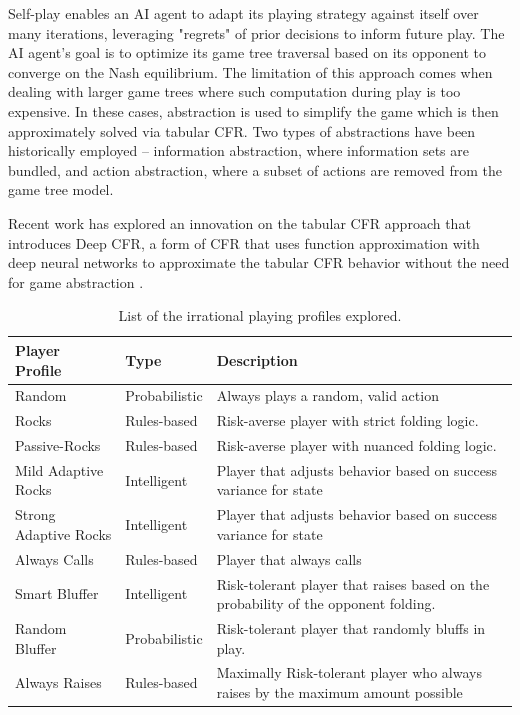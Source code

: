 \documentclass{article}
\begin{document}
\indent Self-play enables an AI agent to adapt its playing strategy against itself over many iterations, leveraging "regrets" of prior decisions to inform future play. The AI agent's goal is to optimize its game tree traversal based on its opponent to converge on the Nash equilibrium. The limitation of this approach comes when dealing with larger game trees where such computation during play is too expensive. In these cases, abstraction is used to simplify the game which is then approximately solved via tabular CFR. Two types of abstractions have been historically employed -- information abstraction, where information sets are bundled, and action abstraction, where a subset of actions are removed from the game tree model.

\indent Recent work has explored an innovation on the tabular CFR approach that introduces Deep CFR, a form of CFR that uses function approximation with deep neural networks to approximate the tabular CFR behavior without the need for game abstraction \cite{brown2018deep}.

\begin{table}[!b]
\small
\centering
{\begin{tabular}{|l|l|l|}
\hline
Player Profile & Type & Description \\
\hline\hline
Random & Probabilistic & Always plays a random, valid action \\
Rocks & Rules-based & Risk-averse player with strict folding logic. \\
Passive-Rocks & Rules-based & Risk-averse player with nuanced folding logic. \\
Mild Adaptive Rocks & Intelligent & Player that adjusts behavior based on success variance for state\\
Strong Adaptive Rocks & Intelligent & Player that adjusts behavior based on success variance for state\\
Always Calls & Rules-based & Player that always calls \\
Smart Bluffer & Intelligent & Risk-tolerant player that raises based on the probability of the opponent folding. \\
Random Bluffer & Probabilistic & Risk-tolerant player that randomly bluffs in play. \\
Always Raises & Rules-based & Maximally Risk-tolerant player who always raises by the maximum amount possible \\
\hline
\end{tabular}}
\caption{List of the irrational playing profiles explored.}
\label{tab:playerprofiles}
\end{table}
\end{document}
